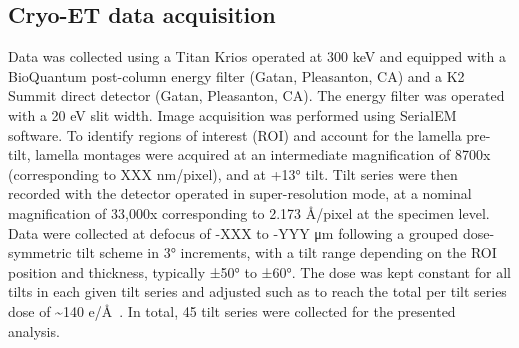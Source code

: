 \subsection{Cryo-ET data acquisition}
Data was collected using a Titan Krios operated at 300 keV and equipped with a BioQuantum post-column energy filter (Gatan, Pleasanton, CA) and a K2 Summit direct detector (Gatan, Pleasanton, CA).
The energy filter was operated with a 20 eV slit width.
Image acquisition was performed using SerialEM software.
To identify regions of interest (ROI) and account for the lamella pre-tilt, lamella montages were acquired at an intermediate magnification of 8700x (corresponding to XXX nm/pixel), and at +13° tilt.
Tilt series were then recorded with the detector operated in super-resolution mode, at a nominal magnification of 33,000x corresponding to 2.173 Å/pixel at the specimen level.
Data were collected at defocus of -XXX to -YYY μm following a grouped dose-symmetric tilt scheme in 3° increments, with a tilt range depending on the ROI position and thickness, typically ±50° to ±60°.
The dose was kept constant for all tilts in each given tilt series and adjusted such as to reach the total per tilt series dose of \sim140 e/Å~\cite{ericksonHowBacterialCell2017}.
In total, 45 tilt series were collected for the presented analysis.

